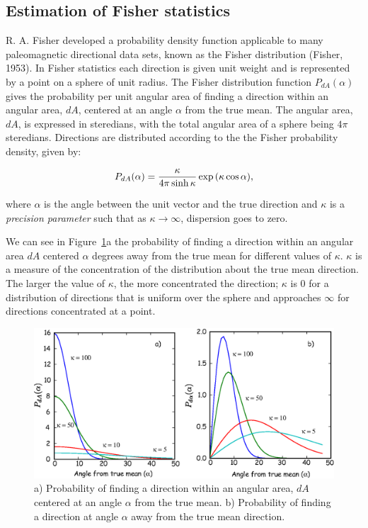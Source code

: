  


\subsection {Estimation of Fisher statistics}
\label{sect:fisher}


R. A. Fisher  developed a probability density function applicable to many paleomagnetic directional data sets, known as the
 Fisher distribution  (Fisher, 1953).  In Fisher statistics each direction is given unit weight and is represented
by a point on a sphere of unit radius. The Fisher distribution function $P_{dA}(\alpha)$ gives the probability per
unit angular area of finding a direction within an angular area, $dA$, centered at an angle $\alpha$ from the true mean.
The angular area, $dA$, is expressed in steredians, with the total angular area of a sphere being $4\pi$ steredians.
Directions are distributed according to the 
the Fisher probability density,  given by:

\begin{equation} 
{P_{dA}(\alpha)} = {\kappa \over 4\pi \sinh \kappa} \exp (\kappa \cos \alpha), 
\label{eq:fishdis}
\end{equation}

\noindent where  $\alpha $ is the angle between the unit vector and
the true direction and $\kappa $ is a {\it precision parameter} such that as $\kappa
\to \infty$, dispersion goes to zero. 



We can see in Figure~\ref{fig:P}a the probability of finding a direction  within an angular area $dA$ centered $\alpha$ degrees away from the true mean  for different values of $\kappa$.  $\kappa$ is a measure of the concentration of the distribution about the true mean direction. The larger the value of $\kappa$, the more concentrated the direction;   $\kappa$ is 0 for a distribution of directions that is uniform over the sphere and approaches $\infty$ for directions concentrated at a point.   

\begin{figure}[htb]
\centering  \includegraphics[width= 14 cm]{EPSfiles/P.eps}
\caption{a) Probability of finding a direction within an angular area, $dA$ centered at an angle $\alpha$ from the true mean.   b) Probability of finding a direction at angle $\alpha$ away from the true mean direction.}
\label{fig:P}
\end{figure}

